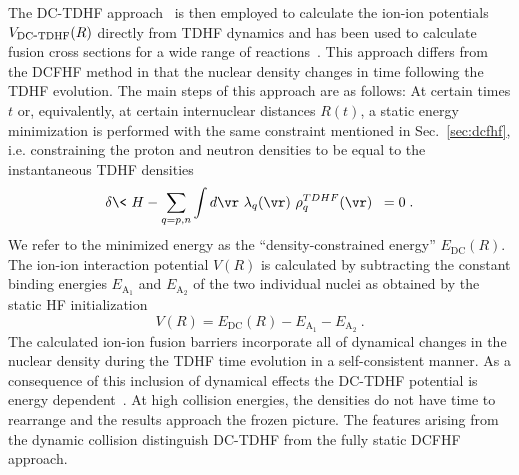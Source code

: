 The DC-TDHF approach~\protect\cite{umar2006b} is then employed to calculate the ion-ion potentials $V_{\mathrm{DC{\hbox{-}}TDHF}}(R)$ directly from TDHF dynamics and has been used to calculate fusion cross sections for a wide range of
reactions~\protect\cite{godbey2017,umar2014a,simenel2013a,umar2012a,umar2006a,oberacker2010,umar2009a,jiang2015a}.
This approach differs from the DCFHF method in that the nuclear density changes in time following the
TDHF evolution.
The main steps of this approach are as follows:
At certain times $t$ or, equivalently, at certain internuclear distances
$R(t)$, a static energy minimization is performed with the same constraint mentioned in Sec.~\ref{sec:dcfhf}, i.e. constraining the proton and neutron densities to be equal to the instantaneous TDHF densities
\begin{equation}
\delta \< \ H - \sum_{q=p,n}\int d\vr \ \lambda_q(\vr) \ \rho^{TDHF}_q(\vr) \ \> = 0\;.
\label{eq:var_dens}
\end{equation}
We refer to the minimized energy as the ``density-constrained energy''
$E_{\mathrm{DC}}(R)$.
The ion-ion interaction potential $V(R)$ is calculated by
subtracting the constant binding energies
$E_{\mathrm{A_{1}}}$ and $E_{\mathrm{A_{2}}}$ of the two individual nuclei as obtained by the static HF initialization
\begin{equation}
V(R)=E_{\mathrm{DC}}(R)-E_{\mathrm{A_{1}}}-E_{\mathrm{A_{2}}}\ .
\label{eq:dctdhfvr}
\end{equation}
The calculated ion-ion fusion barriers incorporate all of dynamical changes in the nuclear density during the TDHF time evolution in a self-consistent manner.
As a consequence of this inclusion of dynamical effects the DC-TDHF potential is energy dependent~\protect\cite{umar2014a}.
At high collision energies, the densities do not have time to rearrange and the results approach the frozen picture.
The features arising from the dynamic collision distinguish DC-TDHF from the fully static DCFHF approach.

